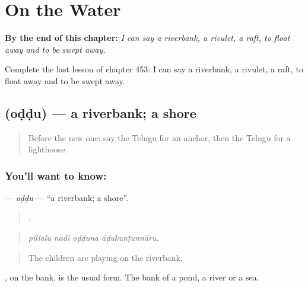
\chapter{On the Water}
\label{ch:te-on-the-water}

\begin{chapteropening}
\textbf{By the end of this chapter:} \emph{I can say a riverbank, a rivulet, a raft, to float away and to be swept away.}

Complete the last lesson of chapter 453: I can say a riverbank, a rivulet, a raft, to float away and to be swept away.
\end{chapteropening}

\section[\texorpdfstring{\te{ఒడ్డు} (oḍḍu)}{ఒడ్డు (oḍḍu)}]{ (oḍḍu) — a riverbank; a shore}

\label{lesson:TE-C453-oddu}



\begin{quote}
Before the new one: say the Telugu for an anchor, then the Telugu for a lighthouse.
\end{quote}

\subsection*{You'll want to know: }
\textbf{} — \emph{oḍḍu} — \textquotedblleft{}a riverbank; a shore\textquotedblright{}.

\begin{quote}
   .
\end{quote}

\begin{quote}
\emph{pillalu nadi oḍḍuna āḍukuṇṭunnāru.}
\end{quote}

\begin{quote}
The children are playing on the riverbank.
\end{quote}

, on the bank, is the usual form. The bank of a pond, a river or a sea.

